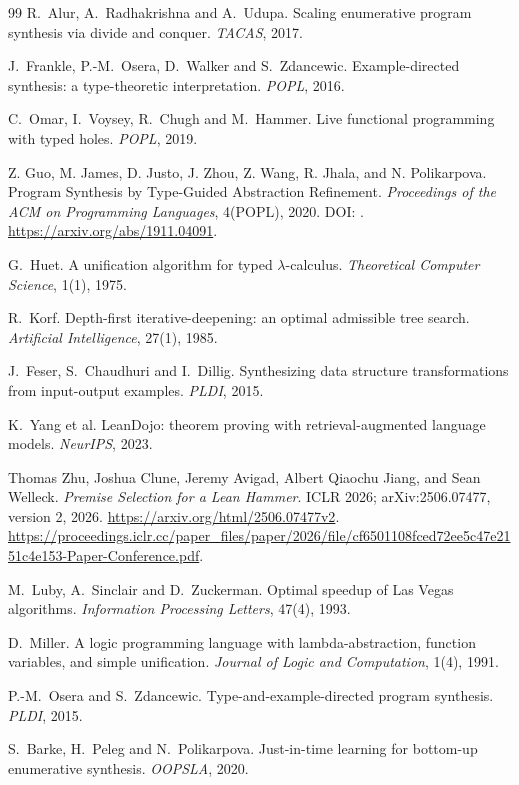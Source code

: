 \begin{thebibliography}{99}
 R.~Alur, A.~Radhakrishna and A.~Udupa. Scaling enumerative program synthesis via divide and conquer. \emph{TACAS}, 2017.

 J.~Frankle, P.-M.~Osera, D.~Walker and S.~Zdancewic. Example-directed synthesis: a type-theoretic interpretation. \emph{POPL}, 2016.

 C.~Omar, I.~Voysey, R.~Chugh and M.~Hammer. Live functional programming with typed holes. \emph{POPL}, 2019.

 Z. Guo, M. James, D. Justo, J. Zhou, Z. Wang, R. Jhala, and N. Polikarpova.
Program Synthesis by Type-Guided Abstraction Refinement.
\emph{Proceedings of the ACM on Programming Languages}, 4(POPL), 2020.
DOI: .
\url{https://arxiv.org/abs/1911.04091}.

 G.~Huet. A unification algorithm for typed $\lambda$-calculus. \emph{Theoretical Computer Science}, 1(1), 1975.

 R.~Korf. Depth-first iterative-deepening: an optimal admissible tree search. \emph{Artificial Intelligence}, 27(1), 1985.

 J.~Feser, S.~Chaudhuri and I.~Dillig. Synthesizing data structure transformations from input-output examples. \emph{PLDI}, 2015.

 K.~Yang et al. LeanDojo: theorem proving with retrieval-augmented language models. \emph{NeurIPS}, 2023.

 Thomas Zhu, Joshua Clune, Jeremy Avigad, Albert Qiaochu Jiang, and Sean Welleck.
\emph{Premise Selection for a Lean Hammer}.
ICLR 2026; arXiv:2506.07477, version 2, 2026.
\url{https://arxiv.org/html/2506.07477v2}.
\url{https://proceedings.iclr.cc/paper_files/paper/2026/file/cf6501108fced72ee5c47e2151c4e153-Paper-Conference.pdf}.

 M.~Luby, A.~Sinclair and D.~Zuckerman. Optimal speedup of Las Vegas algorithms. \emph{Information Processing Letters}, 47(4), 1993.

 D.~Miller. A logic programming language with lambda-abstraction, function variables, and simple unification. \emph{Journal of Logic and Computation}, 1(4), 1991.

 P.-M.~Osera and S.~Zdancewic. Type-and-example-directed program synthesis. \emph{PLDI}, 2015.

 S.~Barke, H.~Peleg and N.~Polikarpova. Just-in-time learning for bottom-up enumerative synthesis. \emph{OOPSLA}, 2020.


\end{thebibliography}
